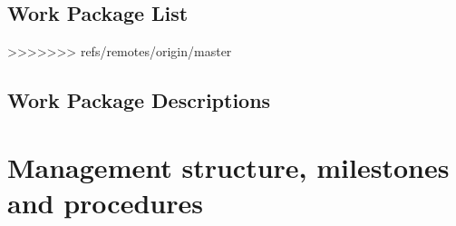 \subsection{Work Package List}\label{sec:wplist}
>>>>>>> refs/remotes/origin/master

\wpfigstyle{\footnotesize}

\newpage

\subsection{Work Package Descriptions}\label{sec:workpackages}
\begin{workplan}
  \newpage
  \newpage
  \newpage
  \newpage
  \newpage
  \newpage
  \newpage
  \newpage
  \newpage
  \newpage
\end{workplan}

\ganttchart[draft,xscale=.45] 

\section{Management structure, milestones and procedures}

